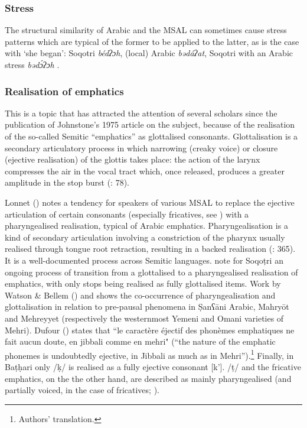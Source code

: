 \documentclass[output=paper]{langsci/langscibook}
\begin{document}
 \subsubsection{Stress}

The structural similarity of Arabic and the MSAL can sometimes cause stress patterns which are typical of the former to be applied to the latter, as is the case with `she began': Soqotri \textit{bédʔɔh}, (local) Arabic \textit{bədáʔat}, Soqotri with an Arabic stress \textit{bədɔ́ʔɔh} \citep[299]{Lonnet2011}.


 \subsubsection{Realisation of emphatics}\label{sec:key:emph}

This is a topic that has attracted the attention of several scholars since the publication of Johnstone’s 1975 article on the subject, because of the realisation of the so-called Semitic “emphatics” as glottalised consonants. Glottalisation is a secondary articulatory process in which narrowing (creaky voice) or closure (ejective realisation) of the glottis takes place: the action of the larynx compresses the air in the vocal tract which, once released, produces a greater amplitude in the stop burst (\citealt{LadefogedMaddieson1996}: 78). 

Lonnet (\citeyear[299]{Lonnet2011}) notes a tendency for speakers of various MSAL to replace the ejective articulation of certain consonants (especially fricatives, see \citealt{RidouaneGendrot2017}) with a pharyngealised realisation, typical of Arabic emphatics. Pharyngealisation is a kind of secondary articulation involving a constriction of the pharynx usually realised through tongue root retraction, resulting in a backed realisation (\citealt{LadefogedMaddieson1996}: 365). It is a well-documented process across Semitic languages. \citet{NaumkinPorkhomovsky1981} note for Soqoṭri an ongoing process of transition from a glottalised to a pharyngealised realisation of emphatics, with only stops being realised as fully glottalised items. Work by Watson \& Bellem (\citeyear{WatsonBellem2010,WatsonBellem2011}) and \citet{WatsonHeselwood2016} shows the co-occurrence of pharyngealisation and glottalisation in relation to pre-pausal phenomena in \d{S}anʕāni Arabic, Mahryōt and Mehreyyet (respectively the westernmost Yemeni and Omani varieties of Mehri). Dufour (\citeyear[22]{Dufour2016}) states that ``le caractère éjectif des phonèmes emphatiques ne fait aucun doute, en jibbali comme en mehri" (“the nature of the emphatic phonemes is undoubtedly ejective, in Jibbali as much as in Mehri”).\footnote{Authors' translation.} Finally, in Baṭḥari only /ḳ/ is realised as a fully ejective consonant [k’]. /ṭ/ and the fricative emphatics, on the the other hand, are described as mainly pharyngealised (and partially voiced, in the case of fricatives; \citealt{Gasparini2017}).
\end{document}
